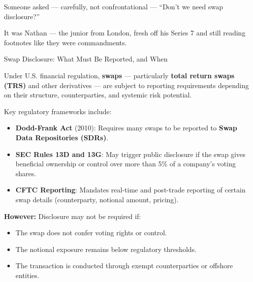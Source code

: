 \medskip








Someone asked — carefully, not confrontational —
“Don’t we need swap disclosure?”

It was Nathan — the junior from London, fresh off his Series 7 and still reading footnotes like they 
were commandments.

\medskip

\begin{TechnicalSidebar}{Swap Disclosure: What Must Be Reported, and When}

    Under U.S. financial regulation, \textbf{swaps} --- particularly \textbf{total return swaps (TRS)} and 
    other derivatives --- are subject to reporting requirements depending on their structure, counterparties, 
    and systemic risk potential.
    
    \medskip
    
    Key regulatory frameworks include:
    
    \medskip
    
    \begin{itemize}
      \item \textbf{Dodd-Frank Act} (2010): Requires many swaps to be reported to \textbf{Swap Data Repositories (SDRs)}.
      \item \textbf{SEC Rules 13D and 13G}: May trigger public disclosure if the swap gives beneficial ownership 
      or control over more than 5\% of a company's voting shares.
      \item \textbf{CFTC Reporting}: Mandates real-time and post-trade reporting of certain swap details (counterparty, 
      notional amount, pricing).
    \end{itemize}
    
    \medskip
    
    \textbf{However:} Disclosure may not be required if:

    
    \medskip
    
    \begin{itemize}
      \item The swap does not confer voting rights or control.
      \item The notional exposure remains below regulatory thresholds.
      \item The transaction is conducted through exempt counterparties or offshore entities.
    \end{itemize}
    

\end{TechnicalSidebar}
